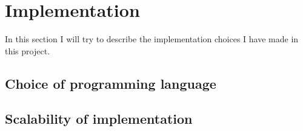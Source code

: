 \section{Implementation}
\label{implementation}

In this section I will try to describe the implementation choices I have made in this project.

\subsection{Choice of programming language}

\subsection{Scalability of implementation}
